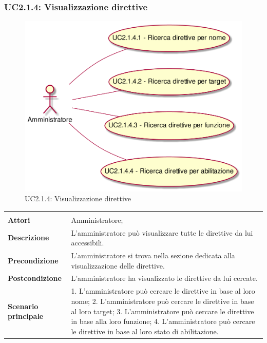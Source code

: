 \subsubsection{UC2.1.4: Visualizzazione direttive }
\label{UC2.1.4}\newpage
\begin{figure}[h]
\centering
\includegraphics[width=\textwidth,height=\textheight,keepaspectratio]{images/UseCaseUC2.1.4.png}
\caption{UC2.1.4: Visualizzazione direttive }
\end{figure}
\begin{longtable}{l|p{10cm}}
\hline
&\\
\textbf{Attori} & Amministratore;\\[7pt]
\textbf{Descrizione} & L'amministratore può visualizzare tutte le direttive da lui accessibili.\\[7pt]
\textbf{Precondizione} & L'amministratore si trova nella sezione dedicata alla visualizzazione delle direttive.\\[7pt]
\textbf{Postcondizione} & L'amministratore ha visualizzato le direttive da lui cercate.\\[7pt]
\textbf{Scenario principale} & 1. L'amministratore può cercare le direttive in base al loro nome;
2. L'amministratore può cercare le direttive in base al loro target;
3. L'amministratore può cercare le direttive in base alla loro funzione;
4. L'amministratore può cercare le direttive in base al loro stato di abilitazione.
\\[7pt]\hline
\end{longtable}

